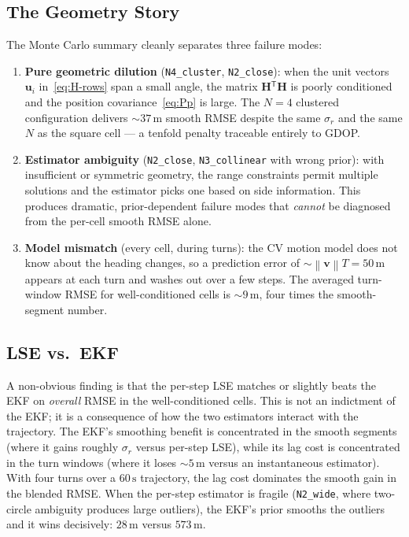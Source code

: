 \documentclass[11pt,a4paper]{article}
\newcommand{\norm}[1]{\left\lVert #1 \right\rVert}
\newcommand{\transpose}{{}^{\mathsf{T}}}
\begin{document}
\subsection{The Geometry Story}

The Monte Carlo summary cleanly separates three failure modes:
%
\begin{enumerate}[leftmargin=2em]
  \item \textbf{Pure geometric dilution} (\texttt{N4\_cluster},
        \texttt{N2\_close}): when the unit vectors $\mathbf{u}_i$
        in~\eqref{eq:H-rows} span a small angle, the matrix
        $\mathbf{H}\transpose \mathbf{H}$ is poorly conditioned and the
        position covariance~\eqref{eq:Pp} is large.  The $N{=}4$
        clustered configuration delivers $\sim$$37\,\mathrm{m}$ smooth
        RMSE despite the same $\sigma_r$ and the same $N$ as the square
        cell --- a tenfold penalty traceable entirely to GDOP.
  \item \textbf{Estimator ambiguity} (\texttt{N2\_close},
        \texttt{N3\_collinear} with wrong prior): with insufficient or
        symmetric geometry, the range constraints permit multiple
        solutions and the estimator picks one based on side information.
        This produces dramatic, prior-dependent failure modes that
        \emph{cannot} be diagnosed from the per-cell smooth RMSE alone.
  \item \textbf{Model mismatch} (every cell, during turns): the CV
        motion model does not know about the heading changes, so a
        prediction error of $\sim$$\norm{\mathbf{v}} T = 50\,\mathrm{m}$
        appears at each turn and washes out over a few steps.  The
        averaged turn-window RMSE for well-conditioned cells is
        $\sim$$9\,\mathrm{m}$, four times the smooth-segment number.
\end{enumerate}

\subsection{LSE vs.\ EKF}

A non-obvious finding is that the per-step LSE matches or slightly beats
the EKF on \emph{overall} RMSE in the well-conditioned cells.  This is not
an indictment of the EKF; it is a consequence of how the two estimators
interact with the trajectory.  The EKF's smoothing benefit is concentrated
in the smooth segments (where it gains roughly $\sigma_r$ versus
per-step LSE), while its lag cost is concentrated in the turn windows
(where it loses $\sim$$5\,\mathrm{m}$ versus an instantaneous estimator).
With four turns over a $60\,\mathrm{s}$ trajectory, the lag cost
dominates the smooth gain in the blended RMSE.  When the per-step
estimator is fragile (\texttt{N2\_wide}, where two-circle ambiguity
produces large outliers), the EKF's prior smooths the outliers and it
wins decisively: $28\,\mathrm{m}$ versus $573\,\mathrm{m}$.
\end{document}
